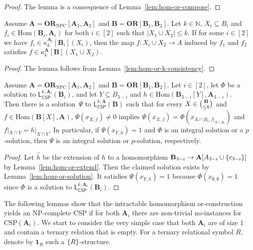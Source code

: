 \documentclass[a4paper,english, thm-restate]{lipics-v2021}
\newcommand{\nat}{\mathbb{N}}
\DeclarePairedDelimiter\set{\lbrace}{\rbrace}
\newcommand{\StructA}{\mathbf{A}}
\newcommand{\StructB}{\mathbf{B}}
\newcommand{\CSP}[1]{\mathrm{CSP}(#1)}
\newcommand{\kcol}[3]{\kappa_{#1}^{#2}[#3]}
\newcommand{\restrict}[2]{#1|_{#2}}
\newcommand{\Hom}[2]{\mathrm{Hom}(#1,#2)}
\newcommand{\leqs}{\mathsf{L}}
\newcommand{\cspiso}[3]{\leqs^{#1,#2}_{\mathsf{CSP}}(#3)}
\newcommand{\ORNPC}[1]{\mathbf{OR}_\text{NPC}[#1]}
\newcommand{\OR}[1]{\mathbf{OR}[#1]}
\newcommand{\onestruc}[1]{\mathbf{1}_{#1}}
\begin{document}
	\homOrIntractableCompose*
	\begin{proof}
		The lemma is a consequence of Lemma~\ref{lem:hom-or-compose}.
	\end{proof}
	
	\begin{lemma}
		\label{lem:hom-or-intractable-k-consistency}
		Assume $\StructA=\ORNPC{\StructA_1,\StructA_2}$
		and $\StructB = \OR{\StructB_1,\StructB_2}$.
		Let $k \in \nat$, $X_i \subseteq B_i$  and $f_i \in \Hom{\StructB_i}{\StructA_i}$ for both $i\in[2]$
		such that $|X_1 \cup X_2|\leq k$.
		If for some $i\in [2]$
		we have $f_i \in \kcol{k}{\StructA_i}{\StructB_i}(X_i)$,
		then the map $f\colon X_i\cup X_2 \to A$ induced by $f_1$ and $f_2$
		satisfies $f \in \kcol{k}{\StructA}{\StructB}(X_1 \cup X_2)$.
	\end{lemma}
	\begin{proof}
		The lemma follows from Lemma~\ref{lem:hom-or-k-consistency}.
	\end{proof}
	
	\begin{lemma}
		\label{lem:hom-or-intractable-solution}
		Assume $\StructA=\ORNPC{\StructA_1,\StructA_2}$
		and $\StructB = \OR{\StructB_1,\StructB_2}$.
		Let  $i \in [2]$, let $\Phi$ be a solution to $\cspiso{k}{\StructA_i}{\StructB_i}$,
		and let $Y \subseteq B_{3-i}$ and $h \in \Hom{\StructB_{3-i}[Y]}{\StructA_{3-i}}$.
		Then there is a solution~$\Psi$ to $\cspiso{k}{\StructA}{\StructB}$
		such that for every $X \in \tbinom{\StructB}{\leq k}$ and $f \in \Hom{\StructB[X]}{\StructA}$,
		$\Psi(x_{X,f})\neq 0$ implies
		$\Psi(x_{X,f}) = \Phi(x_{X\cap B_i, \restrict{f}{X\cap B_i}})$
		and $\restrict{f}{X\cap Y} = \restrict{h}{X\cap Y}$.
		In particular, if $\Psi(x_{Y,h}) = 1$
		and $\Phi$ is an integral solution or a $p$-solution,
		then $\Psi$ is an integral solution or $p$-solution, respectively.
	\end{lemma}
	\begin{proof}
		Let $\hat{h}$ be the extension of $h$
		to a homomorphism $\StructB_{3-i} \to \StructA[A_{3-i} \cup \set{c_{3-i}}]$
		by Lemma~\ref{lem:hom-or-extend}.
		Then the claimed solution exists by Lemma~\ref{lem:hom-or-solution}.
		It satisfies $\Psi(x_{Y,h}) = 1$ because $\Phi(x_{\emptyset,\emptyset}) =1 $
		since $\Phi$ is a solution to $\cspiso{k}{\StructA_i}{\StructB_i}$.
	\end{proof}
	
	
	The following lemmas show that the intractable homomorphism or-construction yields an NP-complete CSP if for both $\StructA_i$ there are non-trivial
	no-instances for $\CSP{\StructA_i}$.
	We start to consider the very simple case  that both $\StructA_i$ are of size $1$
	and contain a ternary relation that is empty.
	For a ternary relational symbol $R$,
	denote by $\onestruc{R}$ such a $\set{R}$-structure.
	
\end{document}
